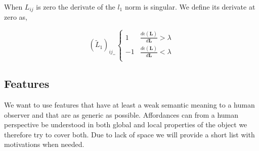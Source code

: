 \normalsize

When \(L_{ij}\) is zero the derivate of the \(l_1\) norm is singular. We
define its derivate at zero as,

\begin{equation}
 ( \tilde{L}_1 )_{ij}_ =
  \begin{cases}
    1   & \frac{d\epsilon(\mathbf{L})}{d\mathbf{L}} > \lambda \\
    -1  & \frac{d\epsilon(\mathbf{L})}{d\mathbf{L}} < \lambda \\
  \end{cases}
\end{equation}

\begin{comment}
[We should maybe investigate if the penalization has the same effect on the eigenvalues as ridge regression ]
\end{comment}

\subsection{Features}\label{features}

We want to use features that have at least a weak semantic meaning to a
human observer and that are as generic as possible. Affordances can from
a human perspective be understood in both global and local properties of
the object we therefore try to cover both. Due to lack of space we will
provide a short list with motivations when needed.

\small

